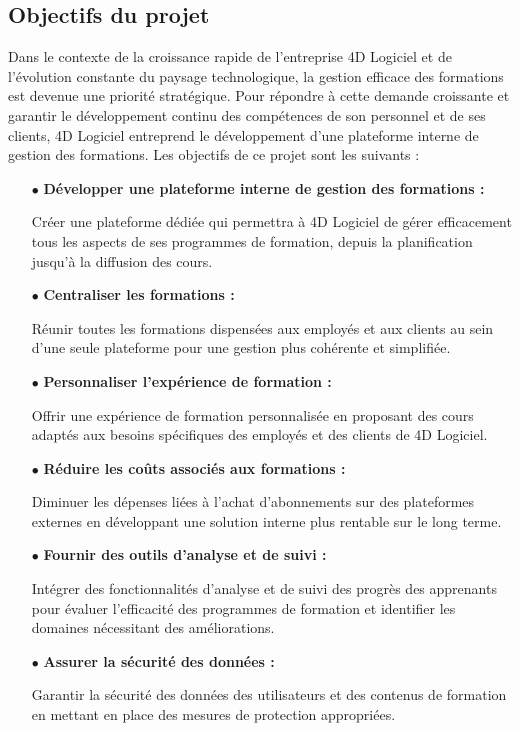  \subsection{Objectifs du projet}

Dans le contexte de la croissance rapide de l'entreprise 4D Logiciel et de l'évolution constante du paysage technologique, la gestion efficace des formations est devenue une priorité stratégique. Pour répondre à cette demande croissante et garantir le développement continu des compétences de son personnel et de ses clients, 4D Logiciel entreprend le développement d'une plateforme interne de gestion des formations. Les objectifs de ce projet sont les suivants :

\begin{itemize}
    \item[$\bullet$] \textbf{Développer une plateforme interne de gestion des formations :} 
    
    Créer une plateforme dédiée qui permettra à 4D Logiciel de gérer efficacement tous les aspects de ses programmes de formation, depuis la planification jusqu'à la diffusion des cours.

    \item[$\bullet$] \textbf{Centraliser les formations :} 
    
    Réunir toutes les formations dispensées aux employés et aux clients au sein d'une seule plateforme pour une gestion plus cohérente et simplifiée.

    \item[$\bullet$] \textbf{Personnaliser l'expérience de formation :} 
    
    Offrir une expérience de formation personnalisée en proposant des cours adaptés aux besoins spécifiques des employés et des clients de 4D Logiciel.

    \item[$\bullet$] \textbf{Réduire les coûts associés aux formations :} 
    
    Diminuer les dépenses liées à l'achat d'abonnements sur des plateformes externes en développant une solution interne plus rentable sur le long terme.

    \item[$\bullet$] \textbf{Fournir des outils d'analyse et de suivi :} 
    
    Intégrer des fonctionnalités d'analyse et de suivi des progrès des apprenants pour évaluer l'efficacité des programmes de formation et identifier les domaines nécessitant des améliorations.
   
    \item[$\bullet$] \textbf{Assurer la sécurité des données :} 
    
    Garantir la sécurité des données des utilisateurs et des contenus de formation en mettant en place des mesures de protection appropriées.

\end{itemize}


